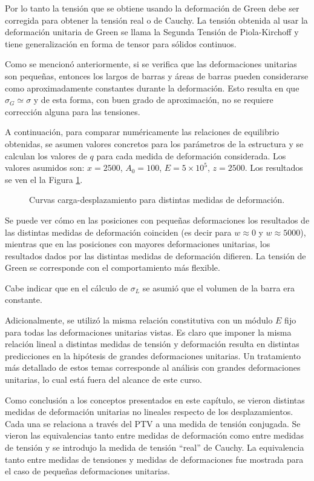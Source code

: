 Por lo tanto la tensión que se obtiene usando la deformación de Green debe ser corregida para obtener la tensión real o de Cauchy. %
%
La tensión obtenida al usar la deformación unitaria de Green se llama la Segunda Tensión de Piola-Kirchoff y tiene generalización en forma de tensor para sólidos continuos.

Como se mencionó anteriormente, si se verifica que las deformaciones unitarias son pequeñas, entonces los largos de barras y áreas de barras pueden considerarse como aproximadamente constantes durante la deformación. Esto resulta en que $\sigma_G \simeq \sigma$ y de esta forma, con buen grado de aproximación, no se requiere corrección alguna para las tensiones.

A continuación, para comparar numéricamente las relaciones de equilibrio obtenidas, se asumen valores concretos para los parámetros de la estructura y se calculan los valores de $q$ para cada medida de deformación considerada. Los valores asumidos son: $x=2500$, $A_0=100$, $E=5\times10^5$, $z=2500$. Los resultados se ven el la Figura \ref{fig:nonlindef}.

\begin{figure}[htb]
	\centering
	\resizebox{.85\textwidth}{!}{}
	\caption{Curvas carga-desplazamiento para distintas medidas de deformación.}
	\label{fig:nonlindef}
\end{figure}


Se puede ver cómo en las posiciones con pequeñas deformaciones los resultados de las distintas medidas de deformación coinciden (es decir para $w \approx 0$ y $w\approx5000$), mientras que en las posiciones con mayores deformaciones unitarias, los resultados dados por las distintas medidas de deformación difieren. %
%
La tensión de Green se corresponde con el comportamiento más flexible.

Cabe indicar que en el cálculo de $\sigma_L$ se asumió que el volumen de la barra era constante.

Adicionalmente, se utilizó la misma relación constitutiva con un módulo $E$ fijo para todas las deformaciones unitarias vistas. Es claro que imponer la misma relación lineal a distintas medidas de tensión y deformación resulta en distintas predicciones en la hipótesis de grandes deformaciones unitarias. Un tratamiento más detallado de estos temas corresponde al análisis con grandes deformaciones unitarias, lo cual está fuera del alcance de este curso.

Como conclusión a los conceptos presentados en este capítulo, se vieron distintas medidas de deformación unitarias no lineales respecto de los desplazamientos. Cada una se relaciona a través del PTV a una medida de tensión conjugada. Se vieron las equivalencias tanto entre medidas de deformación como entre medidas de tensión y se introdujo la medida de tensión ``real'' de Cauchy. La equivalencia tanto entre medidas de tensiones y medidas de deformaciones fue mostrada para el caso de pequeñas deformaciones unitarias.

